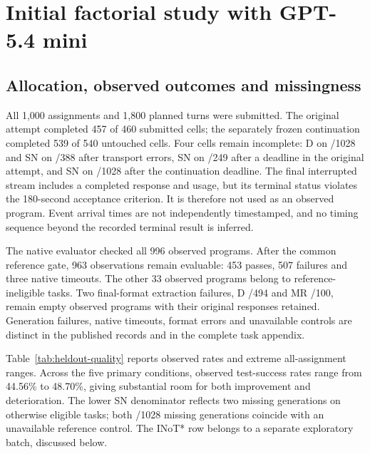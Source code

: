 







\section{Initial factorial study with GPT-5.4 mini}
\label{sec:primary-results}
\subsection{Allocation, observed outcomes and missingness}
All 1,000 assignments and 1,800 planned turns were submitted. The original attempt completed 457 of 460 submitted cells; the separately frozen continuation completed 539 of 540 untouched cells. Four cells remain incomplete: D on /1028 and SN on /388 after transport errors, SN on /249 after a deadline in the original attempt, and SN on /1028 after the continuation deadline. The final interrupted stream includes a completed response and usage, but its terminal status violates the 180-second acceptance criterion. It is therefore not used as an observed program. Event arrival times are not independently timestamped, and no timing sequence beyond the recorded terminal result is inferred.

The native evaluator checked all 996 observed programs. After the common reference gate, 963 observations remain evaluable: 453 passes, 507 failures and three native timeouts. The other 33 observed programs belong to reference-ineligible tasks. Two final-format extraction failures, D /494 and MR /100, remain empty observed programs with their original responses retained. Generation failures, native timeouts, format errors and unavailable controls are distinct in the published records and in the complete task appendix.

Table~\ref{tab:heldout-quality} reports observed rates and extreme all-assignment ranges. Across the five primary conditions, observed test-success rates range from 44.56\% to 48.70\%, giving substantial room for both improvement and deterioration. The lower SN denominator reflects two missing generations on otherwise eligible tasks; both /1028 missing generations coincide with an unavailable reference control. The INoT* row belongs to a separate exploratory batch, discussed below.


